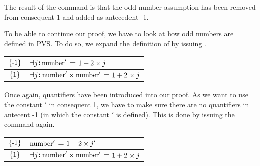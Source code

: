 \vspace{0.1in}

The result of the  command is that the odd number assumption has been removed from consequent 1 and added as antecedent -1.\emptyline

To be able to continue our proof, we have to look at how odd numbers are defined in PVS. To do so, we expand the definition of  by issuing .\emptyline

\begin{tabular}{|cl}
$\{\mbox{\rm -1}\}$ &\begin{minipage}[t]{5.5in}{\begin{alltt}\(\exists\) \(j\): \(\pvsid{number}'\) \(=\) \(\opplustwofn{1}{\optimestwofn{2}{j}}\)\end{alltt}}\end{minipage}\\\hline
$\{\mbox{\rm 1}\}$ &\begin{minipage}[t]{5.5in}{\begin{alltt}\(\exists\) \(j\): \(\optimestwofn{\pvsid{number}'}{\pvsid{number}'}\) \(=\) \(\opplustwofn{1}{\optimestwofn{2}{j}}\)\end{alltt}}\end{minipage}\\
\end{tabular}

\vspace{0.1in}

Once again, quantifiers have been introduced into our proof. As we want to use the constant {{\('\)}} in consequent 1, we have to make sure there are no quantifiers in antecent -1 (in which the constant {{\('\)}} is defined). This is done by issuing the  command again.\emptyline

\begin{tabular}{|cl}
$\{\mbox{\rm -1}\}$ &\begin{minipage}[t]{5.5in}{\begin{alltt}\(\pvsid{number}'\) \(=\) \(\opplustwofn{1}{\optimestwofn{2}{j'}}\)\end{alltt}}\end{minipage}\\\hline
$\{\mbox{\rm 1}\}$ &\begin{minipage}[t]{5.5in}{\begin{alltt}\(\exists\) \(j\): \(\optimestwofn{\pvsid{number}'}{\pvsid{number}'}\) \(=\) \(\opplustwofn{1}{\optimestwofn{2}{j}}\)\end{alltt}}\end{minipage}\\
\end{tabular}

